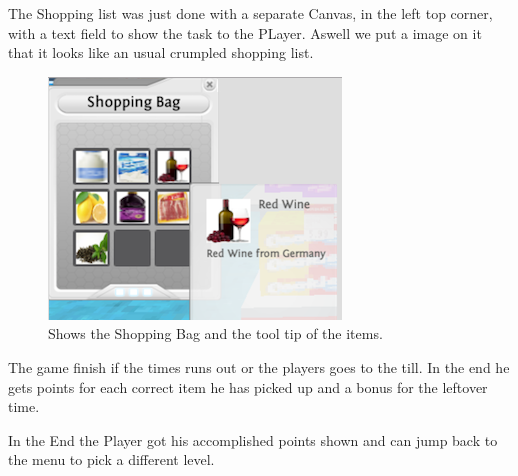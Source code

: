 \documentclass{sig-alternate-05-2015}
\begin{document}
The Shopping list was just done with a separate Canvas, in the left top corner, with a text field to show the task to the PLayer. Aswell we put a image on it that it looks like an usual crumpled shopping list. 

\begin{figure}
    \centering
    \includegraphics[width=\columnwidth]{ShoppingBag.png}
    \caption{Shows the Shopping Bag and the tool tip of the items.}
    \label{fig:ShoppingBag}
\end{figure}

The game finish if the times runs out or the players goes to the till. In the end he gets points for each correct item he has picked up and a bonus for the leftover time.

In the End the Player got his accomplished points shown and can jump back to the menu to pick a different level. 



\end{document}

